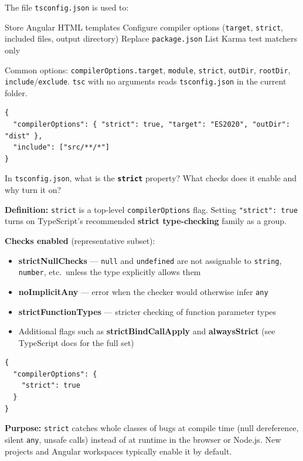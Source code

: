 \newpage




\question[4]
The file \texttt{tsconfig.json} is used to:
\begin{choices}
  \choice Store Angular HTML templates
  \CorrectChoice Configure compiler options (\texttt{target}, \texttt{strict}, included files, output directory)
  \choice Replace \texttt{package.json}
  \choice List Karma test matchers only
\end{choices}
\begin{solution}
  Common options: \texttt{compilerOptions.target}, \texttt{module}, \texttt{strict}, \texttt{outDir}, \texttt{rootDir}, \texttt{include}/\texttt{exclude}. \lstinline[style=bashinline]|tsc| with no arguments reads \texttt{tsconfig.json} in the current folder.
\begin{lstlisting}[style=ts]
{
  "compilerOptions": { "strict": true, "target": "ES2020", "outDir": "dist" },
  "include": ["src/**/*"]
}
\end{lstlisting}
\end{solution}

\question[6]
In \texttt{tsconfig.json}, what is the \textbf{\texttt{strict}} property? What checks does it enable and why turn it on?
\begin{solutionorbox}[5in]
\textbf{Definition:} \texttt{strict} is a top-level \texttt{compilerOptions} flag. Setting \lstinline[style=tsinline]|"strict": true| turns on TypeScript's recommended \textbf{strict type-checking} family as a group.

\textbf{Checks enabled} (representative subset):
\begin{itemize}
  \item \textbf{strictNullChecks} --- \lstinline[style=tsinline]|null| and \lstinline[style=tsinline]|undefined| are not assignable to \lstinline[style=tsinline]|string|, \lstinline[style=tsinline]|number|, etc.\ unless the type explicitly allows them
  \item \textbf{noImplicitAny} --- error when the checker would otherwise infer \lstinline[style=tsinline]|any|
  \item \textbf{strictFunctionTypes} --- stricter checking of function parameter types
  \item Additional flags such as \textbf{strictBindCallApply} and \textbf{alwaysStrict} (see TypeScript docs for the full set)
\end{itemize}

\begin{lstlisting}[style=ts]
{
  "compilerOptions": {
    "strict": true
  }
}
\end{lstlisting}

\textbf{Purpose:} \texttt{strict} catches whole classes of bugs at compile time (null dereference, silent \lstinline[style=tsinline]|any|, unsafe calls) instead of at runtime in the browser or Node.js. New projects and Angular workspaces typically enable it by default.
\end{solutionorbox}



